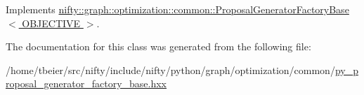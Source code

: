 Implements \hyperlink{classnifty_1_1graph_1_1optimization_1_1common_1_1ProposalGeneratorFactoryBase_a897b36881ba32ea9dd999d8626e4c15e}{nifty\+::graph\+::optimization\+::common\+::\+Proposal\+Generator\+Factory\+Base$<$ O\+B\+J\+E\+C\+T\+I\+V\+E $>$}.



The documentation for this class was generated from the following file\+:\begin{DoxyCompactItemize}
\item 
/home/tbeier/src/nifty/include/nifty/python/graph/optimization/common/\hyperlink{common_2py__proposal__generator__factory__base_8hxx}{py\+\_\+proposal\+\_\+generator\+\_\+factory\+\_\+base.\+hxx}\end{DoxyCompactItemize}
